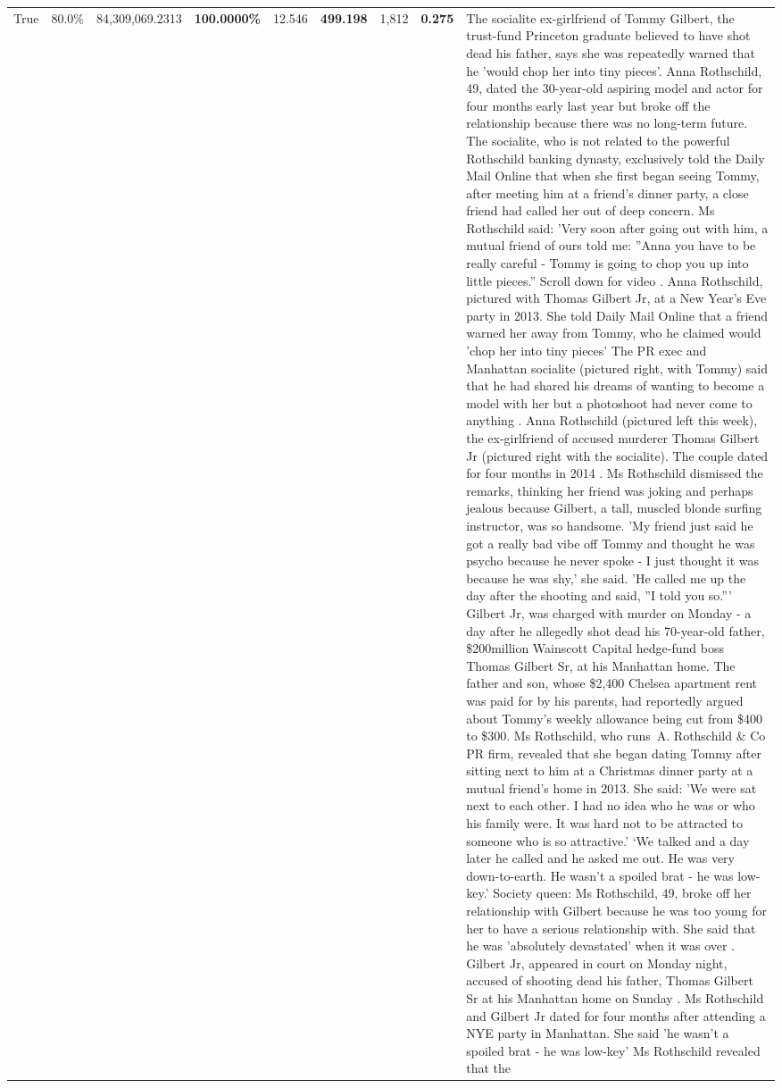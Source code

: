 \begin{table}[H]
\begin{tabular}{lllrlllll}
True & 80.0\% & 84,309,069.2313 & \bfseries \color{red} 100.0000\% & 12.546 & \bfseries \color{red} 499.198 & 1,812 & \bfseries \color{red} 0.275 & The socialite ex-girlfriend of Tommy Gilbert, the trust-fund Princeton graduate believed to have shot dead his father, says she was repeatedly warned that he 'would chop her into tiny pieces'. Anna Rothschild, 49, dated the 30-year-old aspiring model and actor for four months early last year but broke off the relationship because there was no long-term future. The socialite, who is not related to the powerful Rothschild banking dynasty, exclusively told the Daily Mail Online that when she first began seeing Tommy, after meeting him at a friend's dinner party, a close friend had called her out of deep concern. Ms Rothschild said: 'Very soon after going out with him, a mutual friend of ours told me: ''Anna you have to be really careful - Tommy is going to chop you up into little pieces.'' Scroll down for video . Anna Rothschild, pictured with Thomas Gilbert Jr, at a New Year's Eve party in 2013. She told Daily Mail Online that a friend warned her away from Tommy, who he claimed would 'chop her into tiny pieces' The PR exec and Manhattan socialite (pictured right, with Tommy) said that he had shared his dreams of wanting to become a model with her but a photoshoot had never come to anything . Anna Rothschild (pictured left this week), the ex-girlfriend of accused murderer Thomas Gilbert Jr (pictured right with the socialite). The couple dated for four months in 2014 . Ms Rothschild dismissed the remarks, thinking her friend was joking and perhaps jealous because Gilbert, a tall, muscled blonde surfing instructor, was so handsome. 'My friend just said he got a really bad vibe off Tommy and thought he was psycho because he never spoke - I just thought it was because he was shy,' she said. 'He called me up the day after the shooting and said, ''I told you so.''' Gilbert Jr, was charged with murder on Monday - a day after he allegedly shot dead his 70-year-old father, \$200million Wainscott Capital hedge-fund boss Thomas Gilbert Sr, at his Manhattan home. The father and son, whose \$2,400 Chelsea apartment rent was paid for by his parents, had reportedly argued about Tommy's weekly allowance being cut from \$400 to \$300. Ms Rothschild, who runs A. Rothschild \& Co PR firm, revealed that she began dating Tommy after sitting next to him at a Christmas dinner party at a mutual friend's home in 2013. She said: 'We were sat next to each other. I had no idea who he was or who his family were. It was hard not to be attracted to someone who is so attractive.' ‘We talked and a day later he called and he asked me out. He was very down-to-earth. He wasn’t a spoiled brat - he was low-key.’ Society queen: Ms Rothschild, 49, broke off her relationship with Gilbert because he was too young for her to have a serious relationship with. She said that he was 'absolutely devastated' when it was over . Gilbert Jr, appeared in court on Monday night, accused of shooting dead his father, Thomas Gilbert Sr at his Manhattan home on Sunday . Ms Rothschild and Gilbert Jr dated for four months after attending a NYE party in Manhattan. She said 'he wasn't a spoiled brat - he was low-key' Ms Rothschild revealed that the 
\end{tabular}
\end{table}
